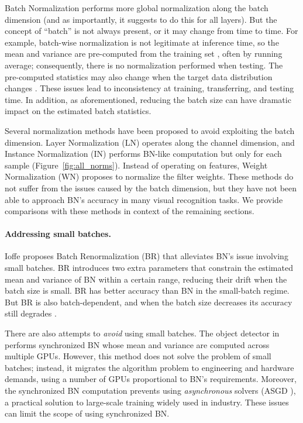 \documentclass[10pt,twocolumn,letterpaper]{article}
\begin{document}
Batch Normalization \cite{Ioffe2015} performs more global normalization along the batch dimension (and as importantly, it suggests to do this for all layers). 
But the concept of ``batch'' is not always present, or it may change from time to time. For example, batch-wise normalization is not legitimate at inference time, so the mean and variance are pre-computed from the training set \cite{Ioffe2015}, often by running average;
consequently, there is no normalization performed when testing. The pre-computed statistics may also change when the target data distribution changes \cite{Rebuffi2017}. These issues lead to inconsistency at training, transferring, and testing time. In addition, as aforementioned, reducing the batch size can have dramatic impact on the estimated batch statistics.

Several normalization methods \cite{Ba2016,Ulyanov2016,Salimans2016,Arpit2016,Ren2017a} have been proposed to avoid exploiting the batch dimension. Layer Normalization (LN) \cite{Ba2016} operates along the channel dimension, and Instance Normalization (IN) \cite{Ulyanov2016} performs BN-like computation but only for each sample (Figure~\ref{fig:all_norms}).
Instead of operating on features, Weight Normalization (WN) \cite{Salimans2016} proposes to normalize the filter weights. These methods do not suffer from the issues caused by the batch dimension, but they have not been able to approach BN's accuracy in many visual recognition tasks.
We provide comparisons with these methods in context of the remaining sections.

\paragraph{Addressing small batches.} 
Ioffe \cite{Ioffe2017} proposes Batch Renormalization (BR) that alleviates BN's issue involving small batches. BR introduces two extra parameters that constrain the estimated mean and variance of BN within a certain range, reducing their drift when the batch size is small.
BR has better accuracy than BN in the small-batch regime. But BR is also batch-dependent, and when the batch size decreases its accuracy still degrades \cite{Ioffe2017}.

There are also attempts to \emph{avoid} using small batches. The object detector in \cite{Peng2018} performs synchronized BN whose mean and variance are computed across multiple GPUs.
However, this method does not solve the problem of small batches; instead, it migrates the algorithm problem to engineering and hardware demands, using a number of GPUs proportional to BN's requirements.
Moreover, the synchronized BN computation prevents using \emph{asynchronous} solvers (ASGD \cite{Dean2012}), a practical solution to large-scale training widely used in industry. These issues can limit the scope of using synchronized BN.
\end{document}
